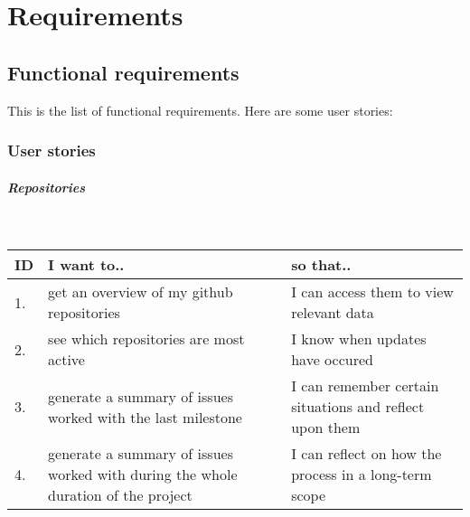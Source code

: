 \chapter{Requirements}
\section{Functional requirements}
This is the list of functional requirements.
Here are some user stories:

\subsection{User stories}
\paragraph{Repositories}\mbox{}\\
\vspace{0.5cm}
 \begin{tabularx}{\linewidth}{| l | X | X |}
    \hline
    \rowcolor[gray]{0.8}
    \textbf{ID} & \textbf{I want to..} & \textbf{so that..} \\
    \hline
    1. & get an overview of my github repositories & I can access them to view relevant data\\
    2. & see which repositories are most active  & I know when updates have occured\\
    3. & generate a summary of issues worked with the last milestone & I can remember certain situations and reflect upon them\\
    4. & generate a summary of issues worked with during the whole duration of the project & I can reflect on how the process in a long-term scope\\
    \hline
\end{tabularx}
\vspace{0.5cm}

